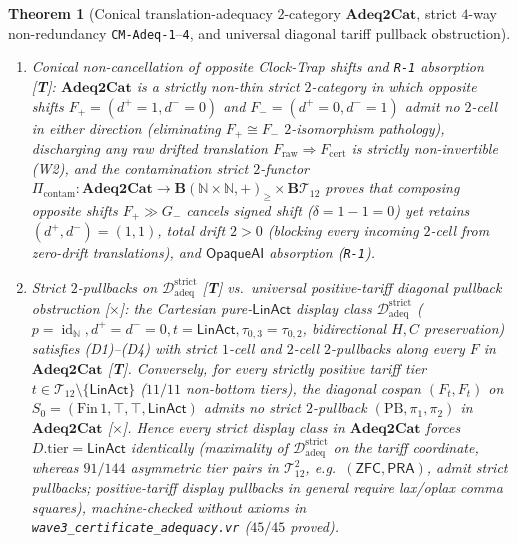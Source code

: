 \documentclass[11pt]{article}
\theoremstyle{plain}
\newtheorem{theorem}{Theorem}[section]
\theoremstyle{definition}
\DeclareMathOperator{\id}{id}
\begin{document}
\begin{theorem}[Conical translation-adequacy $2$-category $\mathbf{Adeq2Cat}$, strict $4$-way non-redundancy \texttt{CM-Adeq-1}--\texttt{4}, and universal diagonal tariff pullback obstruction]
\begin{enumerate}[nosep,label=(\roman*)]
\item \emph{Conical non-cancellation of opposite Clock-Trap shifts and \texttt{R-1} absorption \textup{[\textbf{T}]}}: $\mathbf{Adeq2Cat}$ is a strictly non-thin strict $2$-category in which opposite shifts $F_+ = (d^+=1, d^-=0)$ and $F_- = (d^+=0, d^-=1)$ admit no $2$-cell in either direction (eliminating $F_+ \cong F_-$ $2$-isomorphism pathology), discharging any raw drifted translation $F_{\mathrm{raw}} \Rightarrow F_{\mathrm{cert}}$ is strictly non-invertible \textup{(W2)}, and the contamination strict $2$-functor $\Pi_{\mathrm{contam}} : \mathbf{Adeq2Cat} \to \mathbf{B}(\mathbb{N}\times\mathbb{N}, +)_{\ge} \times \mathbf{B}\mathcal{T}_{12}$ proves that composing opposite shifts $F_+ \gg G_-$ cancels signed shift ($\delta = 1 - 1 = 0$) yet retains $(d^+, d^-) = (1, 1)$, total drift $2 > 0$ (blocking every incoming $2$-cell from zero-drift translations), and $\mathsf{OpaqueAI}$ absorption (\texttt{R-1}).
\item \emph{Strict $2$-pullbacks on $\mathcal{D}_{\mathrm{adeq}}^{\mathrm{strict}}$ \textup{[\textbf{T}]} vs.\ universal positive-tariff diagonal pullback obstruction \textup{[\textbf{$\times$}]}}: the Cartesian pure-$\mathsf{LinAct}$ display class $\mathcal{D}_{\mathrm{adeq}}^{\mathrm{strict}}$ ($p = \id_{\mathbb{N}}, d^+ = d^- = 0, t = \mathsf{LinAct}, \tau_{0,3} = \tau_{0,2}$, bidirectional $H, C$ preservation) satisfies \textup{(D1)--(D4)} with strict $1$-cell and $2$-cell $2$-pullbacks along every $F$ in $\mathbf{Adeq2Cat}$ \textup{[\textbf{T}]}. Conversely, for \emph{every} strictly positive tariff tier $t \in \mathcal{T}_{12} \setminus \{\mathsf{LinAct}\}$ ($11/11$ non-bottom tiers), the diagonal cospan $(F_t, F_t)$ on $S_0 = (\mathrm{Fin}\,1, \top, \top, \mathsf{LinAct})$ admits \emph{no} strict $2$-pullback $(\mathrm{PB}, \pi_1, \pi_2)$ in $\mathbf{Adeq2Cat}$ \textup{[\textbf{$\times$}]}. Hence every strict display class in $\mathbf{Adeq2Cat}$ forces $D.\mathrm{tier} = \mathsf{LinAct}$ identically (maximality of $\mathcal{D}_{\mathrm{adeq}}^{\mathrm{strict}}$ on the tariff coordinate, whereas $91/144$ asymmetric tier pairs in $\mathcal{T}_{12}^2$, e.g.\ $(\mathsf{ZFC}, \mathsf{PRA})$, admit strict pullbacks; positive-tariff display pullbacks in general require lax/oplax comma squares), machine-checked without axioms in \texttt{wave3\_certificate\_adequacy.vr} ($45/45$ proved).
\end{enumerate}
\end{theorem}
\end{document}
